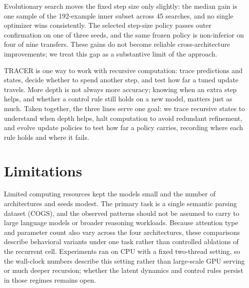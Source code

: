 \documentclass[11pt]{article}
\begin{document}
Evolutionary search moves the fixed step size only slightly: the median gain is one sample of the 192-example inner subset across 45 searches, and no single optimizer wins consistently. The selected step-size policy passes outer confirmation on one of three seeds, and the same frozen policy is non-inferior on four of nine transfers. These gains do not become reliable cross-architecture improvements; we treat this gap as a substantive limit of the approach.

TRACER is one way to work with recursive computation: trace predictions and states, decide whether to spend another step, and test how far a tuned update travels. More depth is not always more accuracy; knowing when an extra step helps, and whether a control rule still holds on a new model, matters just as much. Taken together, the three lines serve one goal: we trace recursive states to understand when depth helps, halt computation to avoid redundant refinement, and evolve update policies to test how far a policy carries, recording where each rule holds and where it fails.

\section*{Limitations}
Limited computing resources kept the models small and the number of architectures and seeds modest. The primary task is a single semantic parsing dataset (COGS), and the observed patterns should not be assumed to carry to large language models or broader reasoning workloads. Because attention type and parameter count also vary across the four architectures, these comparisons describe behavioral variants under one task rather than controlled ablations of the recurrent cell. Experiments ran on CPU with a fixed two-thread setting, so the wall-clock numbers describe this setting rather than large-scale GPU serving or much deeper recursion; whether the latent dynamics and control rules persist in those regimes remains open.


\end{document}
